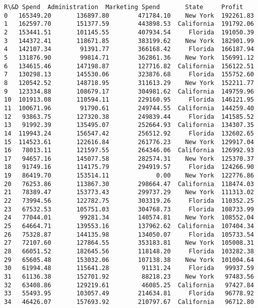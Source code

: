 \documentclass[11pt]{article}
\begin{document}
    \begin{Verbatim}[commandchars=\\\{\}]
    R\&D Spend  Administration  Marketing Spend       State     Profit
0   165349.20       136897.80        471784.10    New York  192261.83
1   162597.70       151377.59        443898.53  California  191792.06
2   153441.51       101145.55        407934.54     Florida  191050.39
3   144372.41       118671.85        383199.62    New York  182901.99
4   142107.34        91391.77        366168.42     Florida  166187.94
5   131876.90        99814.71        362861.36    New York  156991.12
6   134615.46       147198.87        127716.82  California  156122.51
7   130298.13       145530.06        323876.68     Florida  155752.60
8   120542.52       148718.95        311613.29    New York  152211.77
9   123334.88       108679.17        304981.62  California  149759.96
10  101913.08       110594.11        229160.95     Florida  146121.95
11  100671.96        91790.61        249744.55  California  144259.40
12   93863.75       127320.38        249839.44     Florida  141585.52
13   91992.39       135495.07        252664.93  California  134307.35
14  119943.24       156547.42        256512.92     Florida  132602.65
15  114523.61       122616.84        261776.23    New York  129917.04
16   78013.11       121597.55        264346.06  California  126992.93
17   94657.16       145077.58        282574.31    New York  125370.37
18   91749.16       114175.79        294919.57     Florida  124266.90
19   86419.70       153514.11             0.00    New York  122776.86
20   76253.86       113867.30        298664.47  California  118474.03
21   78389.47       153773.43        299737.29    New York  111313.02
22   73994.56       122782.75        303319.26     Florida  110352.25
23   67532.53       105751.03        304768.73     Florida  108733.99
24   77044.01        99281.34        140574.81    New York  108552.04
25   64664.71       139553.16        137962.62  California  107404.34
26   75328.87       144135.98        134050.07     Florida  105733.54
27   72107.60       127864.55        353183.81    New York  105008.31
28   66051.52       182645.56        118148.20     Florida  103282.38
29   65605.48       153032.06        107138.38    New York  101004.64
30   61994.48       115641.28         91131.24     Florida   99937.59
31   61136.38       152701.92         88218.23    New York   97483.56
32   63408.86       129219.61         46085.25  California   97427.84
33   55493.95       103057.49        214634.81     Florida   96778.92
34   46426.07       157693.92        210797.67  California   96712.80

\end{Verbatim}
\end{document}
